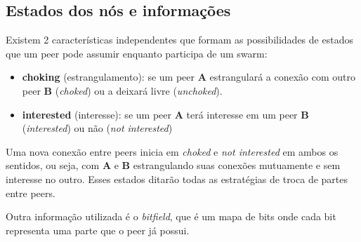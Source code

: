 
\subsection*{Estados dos nós e informações}

Existem 2 características independentes que formam as possibilidades de estados que um
\gls*{peer} pode assumir enquanto participa de um \gls*{swarm}:

\begin{itemize}
    \item \textbf{choking} (estrangulamento): se um \gls*{peer} \textbf{A} estrangulará
        a conexão com outro \gls*{peer} \textbf{B} (\emph{choked}) ou a deixará livre
        (\emph{unchoked}).

    \item \textbf{interested} (interesse): se um \gls*{peer} \textbf{A} terá interesse
        em um \gls*{peer} \textbf{B} (\emph{interested}) ou não (\emph{not interested})
\end{itemize}

Uma nova conexão entre \glspl*{peer} inicia em \emph{choked} e \emph{not interested} em
ambos os sentidos, ou seja, com \textbf{A} e \textbf{B} estrangulando suas conexões
mutuamente e sem interesse no outro. Esses estados ditarão todas as estratégias de troca
de partes entre \glspl*{peer}.

Outra informação utilizada é o \emph{bitfield}, que é um mapa de bits onde cada bit
representa uma parte que o \gls*{peer} já possui.